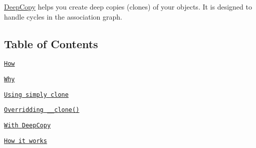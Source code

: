 \mbox{\hyperlink{namespace_deep_copy}{Deep\+Copy}} helps you create deep copies (clones) of your objects. It is designed to handle cycles in the association graph.

\href{https://travis-ci.org/myclabs/DeepCopy}{\tt } \href{https://coveralls.io/r/myclabs/DeepCopy?branch=master}{\tt } \href{https://scrutinizer-ci.com/g/myclabs/DeepCopy/}{\tt } \href{https://packagist.org/packages/myclabs/deep-copy}{\tt }

\subsection*{Table of Contents}


\begin{DoxyEnumerate}
\item \href{#how}{\tt How}
\end{DoxyEnumerate}
\begin{DoxyEnumerate}
\item \href{#why}{\tt Why}
\begin{DoxyEnumerate}
\item \href{#using-simply-clone}{\tt Using simply {\ttfamily clone}}
\end{DoxyEnumerate}
\begin{DoxyEnumerate}
\item \href{#overridding-__clone}{\tt Overridding {\ttfamily \+\_\+\+\_\+clone()}}
\end{DoxyEnumerate}
\begin{DoxyEnumerate}
\item \href{#with-deepcopy}{\tt With {\ttfamily Deep\+Copy}}
\end{DoxyEnumerate}
\end{DoxyEnumerate}
\begin{DoxyEnumerate}
\item \href{#how-it-works}{\tt How it works}
\end{DoxyEnumerate}
